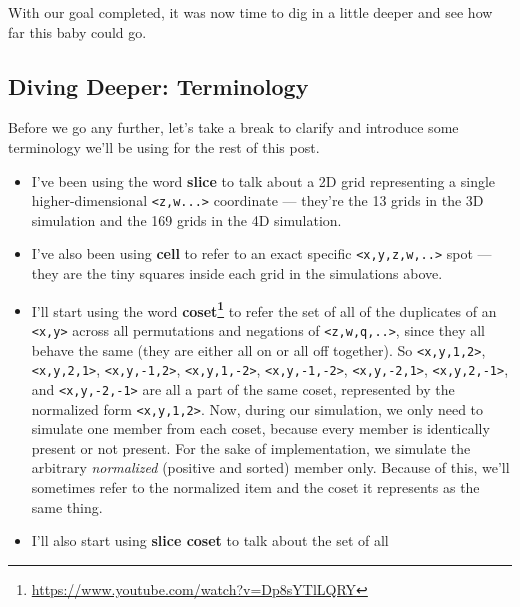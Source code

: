 \documentclass[]{article}
\renewcommand{\href}[2]{#2\footnote{\url{#1}}}
\begin{document}
With our goal completed, it was now time to dig in a little deeper and see how
far this baby could go.

\hypertarget{diving-deeper-terminology}{%
\subsection{Diving Deeper: Terminology}\label{diving-deeper-terminology}}

Before we go any further, let's take a break to clarify and introduce some
terminology we'll be using for the rest of this post.

\begin{itemize}
\item
  I've been using the word \textbf{slice} to talk about a 2D grid representing a
  single higher-dimensional \texttt{\textless{}z,w...\textgreater{}} coordinate
  --- they're the 13 grids in the 3D simulation and the 169 grids in the 4D
  simulation.
\item
  I've also been using \textbf{cell} to refer to an exact specific
  \texttt{\textless{}x,y,z,w,..\textgreater{}} spot --- they are the tiny
  squares inside each grid in the simulations above.
\item
  I'll start using the word
  \textbf{\href{https://www.youtube.com/watch?v=Dp8sYTlLQRY}{coset}} to refer
  the set of all of the duplicates of an \texttt{\textless{}x,y\textgreater{}}
  across all permutations and negations of
  \texttt{\textless{}z,w,q,..\textgreater{}}, since they all behave the same
  (they are either all on or all off together). So
  \texttt{\textless{}x,y,1,2\textgreater{}},
  \texttt{\textless{}x,y,2,1\textgreater{}},
  \texttt{\textless{}x,y,-1,2\textgreater{}},
  \texttt{\textless{}x,y,1,-2\textgreater{}},
  \texttt{\textless{}x,y,-1,-2\textgreater{}},
  \texttt{\textless{}x,y,-2,1\textgreater{}},
  \texttt{\textless{}x,y,2,-1\textgreater{}}, and
  \texttt{\textless{}x,y,-2,-1\textgreater{}} are all a part of the same coset,
  represented by the normalized form \texttt{\textless{}x,y,1,2\textgreater{}}.
  Now, during our simulation, we only need to simulate one member from each
  coset, because every member is identically present or not present. For the
  sake of implementation, we simulate the arbitrary \emph{normalized} (positive
  and sorted) member only. Because of this, we'll sometimes refer to the
  normalized item and the coset it represents as the same thing.
\item
  I'll also start using \textbf{slice coset} to talk about the set of all

\end{itemize}
\end{document}
